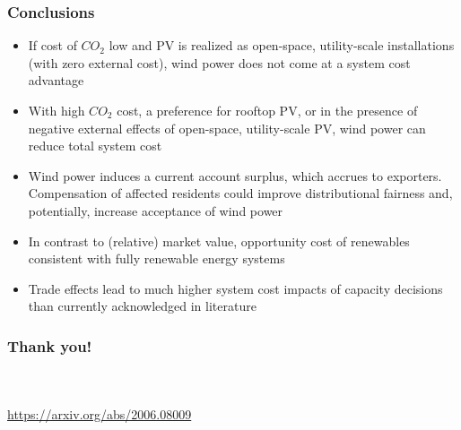 \documentclass[aspectratio=1610, xcolor=dvipsnames]{beamer}
\begin{document}
    \begin{frame}
        \frametitle{Conclusions}
        \begin{itemize}
            \item If cost of $CO_2$ low and PV is realized as open-space, utility-scale installations (with zero external cost),
            wind power does not come at a system cost advantage
            \item With high $CO_2$ cost, a preference for rooftop PV, or in the presence of negative external effects of
            open-space, utility-scale PV, wind power can reduce total system cost
            \item Wind power induces a current account surplus, which accrues to exporters. Compensation of affected
            residents could improve distributional fairness and, potentially, increase acceptance of wind power
            \item In contrast to (relative) market value, opportunity cost of renewables consistent with fully renewable energy systems
            \item Trade effects lead to much higher system cost impacts of capacity decisions than currently acknowledged in literature
        \end{itemize}
    \end{frame}

    \begin{frame}
        \frametitle{Thank you!}
        \begin{center}
            \\%
            \vspace{0.6cm}
            \\
            \vspace{0.6 cm}
            \href{https://arxiv.org/abs/2006.08009}{https://arxiv.org/abs/2006.08009}
        \end{center}
    \end{frame}
\end{document}
